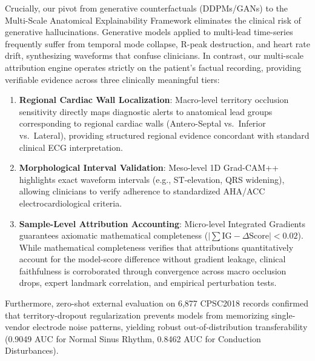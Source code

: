 \documentclass[5p,twocolumn,10pt]{elsarticle}
\begin{document}
Crucially, our pivot from generative counterfactuals (DDPMs/GANs) to the Multi-Scale Anatomical Explainability Framework eliminates the clinical risk of generative hallucinations. Generative models applied to multi-lead time-series frequently suffer from temporal mode collapse, R-peak destruction, and heart rate drift, synthesizing waveforms that confuse clinicians. In contrast, our multi-scale attribution engine operates strictly on the patient's factual recording, providing verifiable evidence across three clinically meaningful tiers:
\begin{enumerate}
    \item \textbf{Regional Cardiac Wall Localization}: Macro-level territory occlusion sensitivity directly maps diagnostic alerts to anatomical lead groups corresponding to regional cardiac walls (Antero-Septal vs.\ Inferior vs.\ Lateral), providing structured regional evidence concordant with standard clinical ECG interpretation.
    \item \textbf{Morphological Interval Validation}: Meso-level 1D Grad-CAM++ highlights exact waveform intervals (e.g., ST-elevation, QRS widening), allowing clinicians to verify adherence to standardized AHA/ACC electrocardiological criteria.
    \item \textbf{Sample-Level Attribution Accounting}: Micro-level Integrated Gradients guarantees axiomatic mathematical completeness ($|\sum \text{IG} - \Delta \text{Score}| < 0.02$). While mathematical completeness verifies that attributions quantitatively account for the model-score difference without gradient leakage, clinical faithfulness is corroborated through convergence across macro occlusion drops, expert landmark correlation, and empirical perturbation tests.
\end{enumerate}

Furthermore, zero-shot external evaluation on 6,877 CPSC2018 records confirmed that territory-dropout regularization prevents models from memorizing single-vendor electrode noise patterns, yielding robust out-of-distribution transferability (0.9049 AUC for Normal Sinus Rhythm, 0.8462 AUC for Conduction Disturbances).
\end{document}
